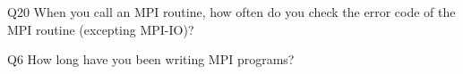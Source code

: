 \begin{description}%
\item{Q20} When you call an MPI routine, how often do you check the error code of the MPI routine  (excepting MPI-IO)?%
\item{Q6} How long have you been writing MPI programs?%
\end{description}%
